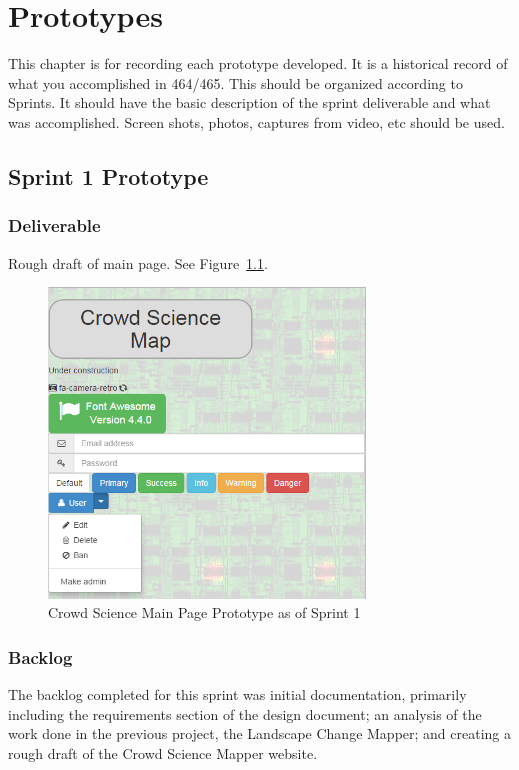 

\chapter{Prototypes}

This chapter is for recording each prototype developed.  It is a historical record of what you accomplished in 464/465.   This should be organized according to Sprints.  It should have the basic description of the sprint deliverable and what was accomplished.  Screen shots, photos, captures from video, etc should be used.  

\section{Sprint 1 Prototype}
\subsection{Deliverable}
Rough draft of main page. See Figure~\ref{prototype_S1_main}.

\begin{figure}[tbh]
\begin{center}
\includegraphics[width=0.75\textwidth]{./figures/prototype_S1_main.png}
\end{center}
\caption{Crowd Science Main Page Prototype as of Sprint 1\label{prototype_S1_main}}
\end{figure}

\subsection{Backlog}
The backlog completed for this sprint was initial documentation, primarily including the requirements section of the design document; an analysis of the work done in the previous project, the Landscape Change Mapper; and creating a rough draft of the Crowd Science Mapper website.
